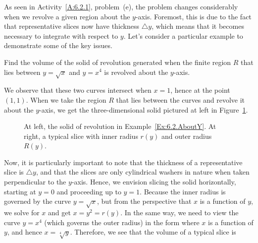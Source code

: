 As seen in Activity~\ref{A:6.2.1}, problem~(e), the problem changes considerably when we revolve a given region about the $y$-axis.  Foremost, this is due to the fact that representative slices now have thickness $\triangle y$, which means that it becomes necessary to integrate with respect to $y$.  Let's consider a particular example to demonstrate some of the key issues.

\newpage

\bex \label{Ex:6.2.AboutY}
Find the volume of the solid of revolution generated when the finite region $R$ that lies between $y = \sqrt{x}$ and $y = x^4$ is revolved about the $y$-axis.
\eex

We observe that these two curves intersect when $x = 1$, hence at the point $(1,1)$.  When we take the region $R$ that lies between the curves and revolve it about the $y$-axis, we get the three-dimensional solid pictured at left in Figure~\ref{F:6.2.Ex3}.
\begin{figure}[h]
\begin{center}
\hspace{0.25in} 
\caption{At left, the solid of revolution in Example~\ref{Ex:6.2.AboutY}.  At right, a typical slice with inner radius $r(y)$ and outer radius $R(y)$.} \label{F:6.2.Ex3}
\end{center}
\end{figure}
Now, it is particularly important to note that the thickness of a representative slice is $\triangle y$, and that the slices are only cylindrical washers in nature when taken perpendicular to the $y$-axis.  Hence, we envision slicing the solid horizontally, starting at $y = 0$ and proceeding up to $y = 1$.  Because the inner radius is governed by the curve $y = \sqrt{x}$, but from the perspective that $x$ is a function of $y$, we solve for $x$ and get $x = y^2 = r(y)$.  In the same way, we need to view the curve $y = x^4$ (which governs the outer radius) in the form where $x$ is a function of $y$, and hence $x = \sqrt[4]{y}$.  Therefore, we see that the volume of a typical slice is 
